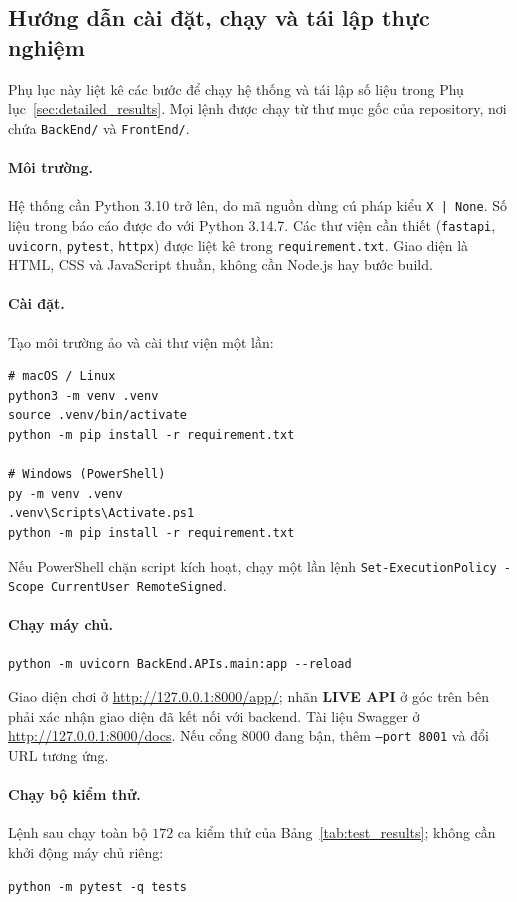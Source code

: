 \subsection{Hướng dẫn cài đặt, chạy và tái lập thực nghiệm}
\label{sec:reproduction}

Phụ lục này liệt kê các bước để chạy hệ thống và tái lập số liệu trong
Phụ lục~\ref{sec:detailed_results}. Mọi lệnh được chạy từ thư mục gốc của
repository, nơi chứa \nolinkurl{BackEnd/} và \nolinkurl{FrontEnd/}.

\paragraph{Môi trường.}
Hệ thống cần Python 3.10 trở lên, do mã nguồn dùng cú pháp kiểu
\texttt{X | None}. Số liệu trong báo cáo được đo với Python 3.14.7. Các thư
viện cần thiết (\texttt{fastapi}, \texttt{uvicorn}, \texttt{pytest},
\texttt{httpx}) được liệt kê trong \texttt{requirement.txt}. Giao diện là
HTML, CSS và JavaScript thuần, không cần Node.js hay bước build.

\paragraph{Cài đặt.}
Tạo môi trường ảo và cài thư viện một lần:
\begin{verbatim}
# macOS / Linux
python3 -m venv .venv
source .venv/bin/activate
python -m pip install -r requirement.txt

# Windows (PowerShell)
py -m venv .venv
.venv\Scripts\Activate.ps1
python -m pip install -r requirement.txt
\end{verbatim}
Nếu PowerShell chặn script kích hoạt, chạy một lần lệnh
\texttt{Set-ExecutionPolicy -Scope CurrentUser RemoteSigned}.

\paragraph{Chạy máy chủ.}
\begin{verbatim}
python -m uvicorn BackEnd.APIs.main:app --reload
\end{verbatim}
Giao diện chơi ở \url{http://127.0.0.1:8000/app/}; nhãn \textbf{LIVE API} ở góc
trên bên phải xác nhận giao diện đã kết nối với backend. Tài liệu Swagger ở
\url{http://127.0.0.1:8000/docs}. Nếu cổng 8000 đang bận, thêm
\texttt{--port 8001} và đổi URL tương ứng.

\paragraph{Chạy bộ kiểm thử.}
Lệnh sau chạy toàn bộ $172$ ca kiểm thử của Bảng~\ref{tab:test_results}; không
cần khởi động máy chủ riêng:
\begin{verbatim}
python -m pytest -q tests
\end{verbatim}

